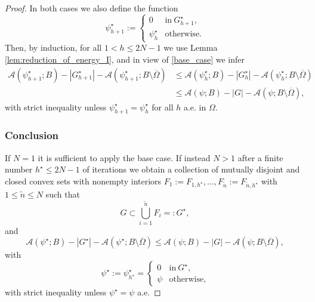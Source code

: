 \documentclass[11pt]{article}
\numberwithin{equation}{section}
\let\Om\Omega
\theoremstyle{definition}
\begin{document}
\begin{proof}
In both cases we also define the function
\begin{equation*}
\psi_{h+1}^\star:=\begin{cases}
0&\text{in}\ G_{h+1}^\star,\\
\psi_h^\star&\text{otherwise}.
\end{cases}
\end{equation*}
Then, by induction, for all $1<h\le 2N-1$ we use Lemma \ref{lem:reduction_of_energy_I}, and
in view of \eqref{base_case} we infer
\begin{align*}
\mathcal A(\psi_{h+1}^\star;B)-|G_{h+1}^\star|-\mathcal A(\psi_{h+1}^\star;B\setminus \overline\Omega)&\leq 
\mathcal A(\psi_h^\star;B)-|G_h^\star|-\mathcal A(\psi_h^\star;B\setminus \overline\Omega)\\
&\leq 
\mathcal A(\psi;B)-|G|-\mathcal A(\psi;B\setminus \overline\Omega),
\end{align*}
with strict inequality unless $\psi_{h+1}^\star=\psi_h^\star$ for all $h$ a.e. in $\Om$.

\subsubsection*{Conclusion} If $N=1$ it is sufficient to apply
the base case. If instead $N>1$ after a finite number $h^\star\le 2N-1$ of iterations we obtain a collection of mutually disjoint and closed convex sets with nonempty interiors $F_1:=F_{1,h^\star},\dots,F_{\tilde n}:=F_{\tilde n,h^\star}$ with $1\le \tilde n\le N$ such that
\[
G\subset \bigcup_{i=1}^{\tilde n}F_i=:G^\star,
\]
and
\begin{equation*}\mathcal{A}(\psi^\star;B)-|G^\star|-\mathcal{A}(\psi^\star;B\setminus \overline\Om)\le \mathcal A(\psi; B)-|G|-\mathcal{A}(\psi;B\setminus\overline{\Om}),
\end{equation*}
with
\begin{equation*}
\psi^\star:=\psi_{h^\star}^\star=\begin{cases}
0&\text{in}\ G^\star,\\
\psi&\text{otherwise},
\end{cases}
\end{equation*}
with strict inequality unless $\psi^\star=\psi$ a.e.
\end{proof}
\end{document}
